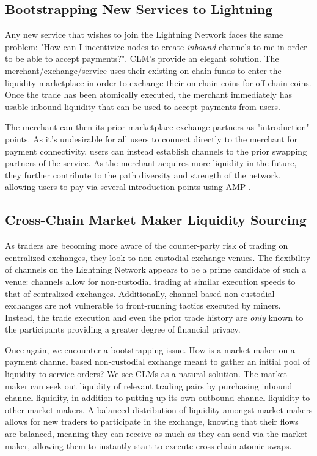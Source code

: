\documentclass[12pt,a4paper]{article}
\theoremstyle{definition}
\begin{document}
\subsection{Bootstrapping New Services to Lightning}

Any new service that wishes to join the Lightning Network faces the same problem:
"How can I incentivize nodes to create \emph{inbound} channels to me in order
to be able to accept payments?". CLM's provide an elegant solution. The
merchant/exchange/service uses their existing on-chain funds to enter the
liquidity marketplace in order to exchange their on-chain coins for off-chain
coins. Once the trade has been atomically executed, the merchant immediately
has usable inbound liquidity that can be used to accept payments from users.

The merchant can then its prior marketplace exchange partners as
"introduction" points. As it's undesirable for all users to connect directly to
the merchant for payment connectivity, users can instead establish channels to
the prior swapping partners of the service. As the merchant acquires more
liquidity in the future, they further contribute to the path diversity and
strength of the network, allowing users to pay via several introduction points
using AMP \cite{amp}.

\subsection{Cross-Chain Market Maker Liquidity Sourcing}

As traders are becoming more aware of the counter-party risk of trading on
centralized exchanges, they look to non-custodial exchange venues. The
flexibility of channels on the Lightning Network appears to be a prime
candidate of such a venue: channels allow for non-custodial trading at similar
execution speeds to that of centralized exchanges. Additionally, channel based
non-custodial exchanges are not vulnerable to front-running tactics executed by
miners. Instead, the trade execution and even the prior trade history are
\emph{only} known to the participants providing a greater degree of
financial privacy.

Once again, we encounter a bootstrapping issue. How is a market maker on a
payment channel based non-custodial exchange meant to gather an initial pool of
liquidity to service orders? We see CLMs as a natural solution. The market
maker can seek out liquidity of relevant trading pairs by purchasing inbound
channel liquidity, in addition to putting up its own outbound channel liquidity
to other market makers. A balanced distribution of liquidity amongst market
makers allows for new traders to participate in the exchange, knowing that
their flows are balanced, meaning they can receive as much as they can send via
the market maker, allowing them to instantly start to execute cross-chain
atomic swaps.
\end{document}
